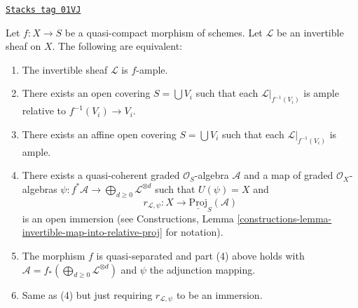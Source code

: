 \begin{lemma}
\label{morphisms-lemma-characterize-relatively-ample}
\href{https://stacks.math.columbia.edu/tag/01VJ}{\texttt{Stacks tag 01VJ}}

\begin{reference}
\cite[II, Proposition 4.6.3]{EGA}
\end{reference}
Let $f : X \to S$ be a quasi-compact morphism of schemes.
Let $\mathcal{L}$ be an invertible sheaf on $X$.
The following are equivalent:
\begin{enumerate}
\item The invertible sheaf $\mathcal{L}$ is $f$-ample.
\item There exists an open covering $S = \bigcup V_i$
such that each $\mathcal{L}|_{f^{-1}(V_i)}$ is ample
relative to $f^{-1}(V_i) \to V_i$.
\item There exists an affine open covering $S = \bigcup V_i$
such that each $\mathcal{L}|_{f^{-1}(V_i)}$ is ample.
\item There exists a quasi-coherent graded $\mathcal{O}_S$-algebra
$\mathcal{A}$ and a map of graded $\mathcal{O}_X$-algebras
$\psi : f^*\mathcal{A} \to \bigoplus_{d \geq 0} \mathcal{L}^{\otimes d}$
such that $U(\psi) = X$ and
$$
r_{\mathcal{L}, \psi} :
X
\longrightarrow
\underline{\text{Proj}}_S(\mathcal{A})
$$
is an open immersion (see Constructions, Lemma
\ref{constructions-lemma-invertible-map-into-relative-proj} for notation).
\item The morphism $f$ is quasi-separated and
part (4) above holds with
$\mathcal{A} = f_*(\bigoplus_{d \geq 0} \mathcal{L}^{\otimes d})$
and $\psi$ the adjunction mapping.
\item Same as (4) but just requiring $r_{\mathcal{L}, \psi}$
to be an immersion.
\end{enumerate}
\end{lemma}

